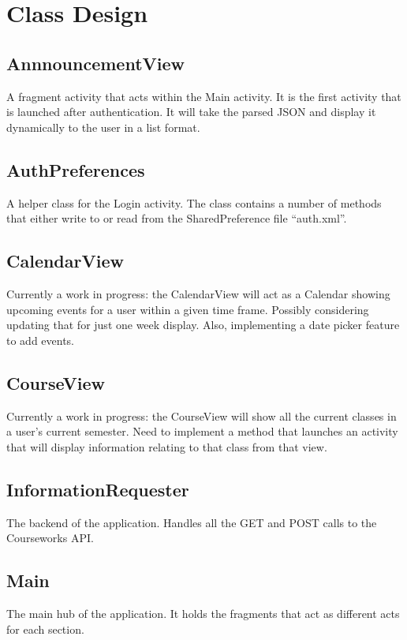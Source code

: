 \documentclass{article}
\begin{document}
\section{Class Design}

\subsection{AnnnouncementView}
A fragment activity that acts within the Main activity. It is the first activity that is
launched after authentication. It will take the parsed JSON and display it dynamically
to the user in a list format.

\subsection{AuthPreferences}
A helper class for the Login activity. The class contains a number of methods that either
write to or read from the SharedPreference file ``auth.xml''.

\subsection{CalendarView}
Currently a work in progress: the CalendarView will act as a Calendar showing upcoming
events for a user within a given time frame. Possibly considering updating that for just
one week display. Also, implementing a date picker feature to add events.

\subsection{CourseView}
Currently a work in progress: the CourseView will show all the current classes in a user's
current semester. Need to implement a method that launches an activity that will display
information relating to that class from that view.

\subsection{InformationRequester}
The backend of the application. Handles all the GET and POST calls to the Courseworks API.

\subsection{Main}
The main hub of the application. It holds the fragments that act as different acts for
each section. 
\end{document}
